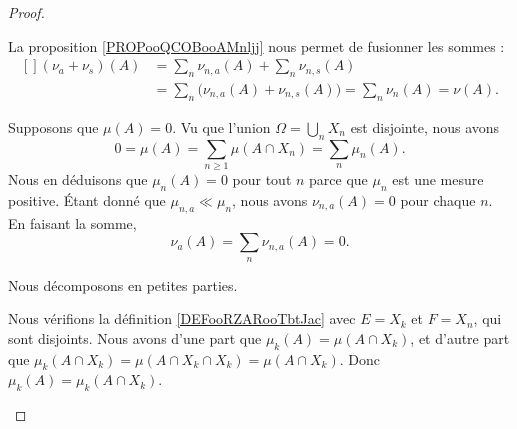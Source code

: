 \begin{proof}
\begin{subproof}
		\spitem[\( \nu=\nu_a+\nu_s\)]

		La proposition \ref{PROPooQCOBooAMnljj} nous permet de fusionner les sommes :
		\begin{equation}
			\begin{aligned}[]
				(\nu_a+\nu_s)(A) & =\sum_n\nu_{n,a}(A)+\sum_n\nu_{n,s}(A)                              \\
				                 & =\sum_n\Big( \nu_{n,a}(A)+\nu_{n,s}(A) \Big)=\sum_n\nu_n(A)=\nu(A).
			\end{aligned}
		\end{equation}

		\spitem[\( \nu_a\ll\mu\)]

		Supposons que \( \mu(A)=0\). Vu que l'union \( \Omega=\bigcup_nX_n\) est disjointe, nous avons
		\begin{equation}
			0=\mu(A)=\sum_{n\geq 1}\mu(A\cap X_n)=\sum_n\mu_n(A).
		\end{equation}
		Nous en déduisons que \( \mu_n(A)=0\) pour tout \( n\) parce que \( \mu_n\) est une mesure positive. Étant donné que \( \mu_{n,a}\ll \mu_n\), nous avons \( \nu_{n,a}(A)=0\) pour chaque \( n\). En faisant la somme,
		\begin{equation}
			\nu_a(A)=\sum_n\nu_{n,a}(A)=0.
		\end{equation}

		\spitem[\( \nu_s\perp \mu\)]
		Nous décomposons en petites parties.
		\begin{subproof}
			Nous vérifions la définition \ref{DEFooRZARooTbtJac} avec \( E=X_k\) et \( F=X_n\), qui sont disjoints. Nous avons d'une part que \( \mu_k(A)=\mu(A\cap X_k)\), et d'autre part que \( \mu_k(A\cap X_k)=\mu(A\cap X_k\cap X_k)=\mu(A\cap X_k)\). Donc \( \mu_k(A)=\mu_k(A\cap X_k)\).


\end{subproof}
\end{subproof}
\end{proof}
